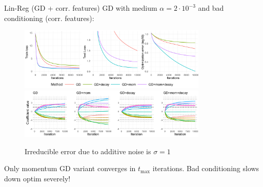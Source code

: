 \documentclass[11pt,compress,t,notes=noshow, xcolor=table]{beamer}
\begin{document}
\begin{vbframe}{Lin-Reg (GD + corr. features)}
\vspace{-0.4cm}
GD with medium $\alpha=2\cdot10^{-3}$ and bad conditioning (corr. features):
\begin{figure}
            \includegraphics[width=0.8\textwidth]{slides/04-multivariate-first-order/figure_man/simu_linmod/GD_reg_med_lr_corr_iters.pdf} \\
             \includegraphics[width=0.8\textwidth]{slides/04-multivariate-first-order/figure_man/simu_linmod/GD_reg_coef_med_corr.pdf}\\
            \begin{footnotesize}
                Irreducible error due to additive noise is $\sigma=1$
            \end{footnotesize}
\end{figure}
Only momentum  GD variant converges in $t_{\text{max}}$ iterations. Bad conditioning slows down optim severely!
\end{vbframe}
\end{document}
